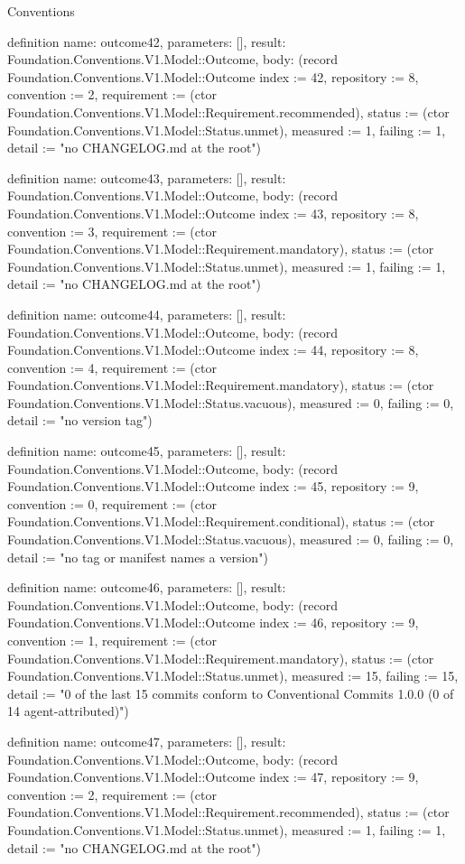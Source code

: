 \begin{lexlean}{Conventions}
\begin{semanticmodule}
definition{
  name: outcome42,
  parameters: [],
  result: Foundation.Conventions.V1.Model::Outcome,
  body: (record Foundation.Conventions.V1.Model::Outcome {index := 42, repository := 8, convention := 2, requirement := (ctor Foundation.Conventions.V1.Model::Requirement.recommended), status := (ctor Foundation.Conventions.V1.Model::Status.unmet), measured := 1, failing := 1, detail := "no CHANGELOG.md at the root"})
}

definition{
  name: outcome43,
  parameters: [],
  result: Foundation.Conventions.V1.Model::Outcome,
  body: (record Foundation.Conventions.V1.Model::Outcome {index := 43, repository := 8, convention := 3, requirement := (ctor Foundation.Conventions.V1.Model::Requirement.mandatory), status := (ctor Foundation.Conventions.V1.Model::Status.unmet), measured := 1, failing := 1, detail := "no CHANGELOG.md at the root"})
}

definition{
  name: outcome44,
  parameters: [],
  result: Foundation.Conventions.V1.Model::Outcome,
  body: (record Foundation.Conventions.V1.Model::Outcome {index := 44, repository := 8, convention := 4, requirement := (ctor Foundation.Conventions.V1.Model::Requirement.mandatory), status := (ctor Foundation.Conventions.V1.Model::Status.vacuous), measured := 0, failing := 0, detail := "no version tag"})
}

definition{
  name: outcome45,
  parameters: [],
  result: Foundation.Conventions.V1.Model::Outcome,
  body: (record Foundation.Conventions.V1.Model::Outcome {index := 45, repository := 9, convention := 0, requirement := (ctor Foundation.Conventions.V1.Model::Requirement.conditional), status := (ctor Foundation.Conventions.V1.Model::Status.vacuous), measured := 0, failing := 0, detail := "no tag or manifest names a version"})
}

definition{
  name: outcome46,
  parameters: [],
  result: Foundation.Conventions.V1.Model::Outcome,
  body: (record Foundation.Conventions.V1.Model::Outcome {index := 46, repository := 9, convention := 1, requirement := (ctor Foundation.Conventions.V1.Model::Requirement.mandatory), status := (ctor Foundation.Conventions.V1.Model::Status.unmet), measured := 15, failing := 15, detail := "0 of the last 15 commits conform to Conventional Commits 1.0.0 (0 of 14 agent-attributed)"})
}

definition{
  name: outcome47,
  parameters: [],
  result: Foundation.Conventions.V1.Model::Outcome,
  body: (record Foundation.Conventions.V1.Model::Outcome {index := 47, repository := 9, convention := 2, requirement := (ctor Foundation.Conventions.V1.Model::Requirement.recommended), status := (ctor Foundation.Conventions.V1.Model::Status.unmet), measured := 1, failing := 1, detail := "no CHANGELOG.md at the root"})
}


\end{semanticmodule}
\end{lexlean}
